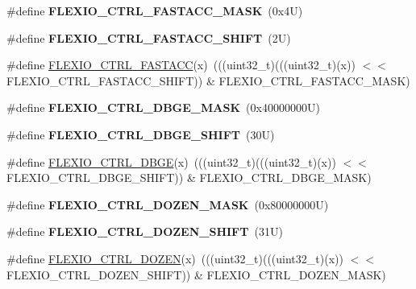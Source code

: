 \begin{DoxyCompactItemize}
\#define {\bfseries F\+L\+E\+X\+I\+O\+\_\+\+C\+T\+R\+L\+\_\+\+F\+A\+S\+T\+A\+C\+C\+\_\+\+M\+A\+SK}~(0x4\+U)
\item 
\mbox{\label{group___f_l_e_x_i_o___register___masks_ga479b6f2cd73feb716395c92639184083}} 
\#define {\bfseries F\+L\+E\+X\+I\+O\+\_\+\+C\+T\+R\+L\+\_\+\+F\+A\+S\+T\+A\+C\+C\+\_\+\+S\+H\+I\+FT}~(2\+U)
\item 
\#define \mbox{\hyperlink{group___f_l_e_x_i_o___register___masks_gada21af7886439796fc0f880c14c20519}{F\+L\+E\+X\+I\+O\+\_\+\+C\+T\+R\+L\+\_\+\+F\+A\+S\+T\+A\+CC}}(x)~(((uint32\+\_\+t)(((uint32\+\_\+t)(x)) $<$$<$ F\+L\+E\+X\+I\+O\+\_\+\+C\+T\+R\+L\+\_\+\+F\+A\+S\+T\+A\+C\+C\+\_\+\+S\+H\+I\+FT)) \& F\+L\+E\+X\+I\+O\+\_\+\+C\+T\+R\+L\+\_\+\+F\+A\+S\+T\+A\+C\+C\+\_\+\+M\+A\+SK)
\item 
\mbox{\label{group___f_l_e_x_i_o___register___masks_gae97e4a693fb34a9f89a313b84a13be6b}} 
\#define {\bfseries F\+L\+E\+X\+I\+O\+\_\+\+C\+T\+R\+L\+\_\+\+D\+B\+G\+E\+\_\+\+M\+A\+SK}~(0x40000000\+U)
\item 
\mbox{\label{group___f_l_e_x_i_o___register___masks_ga8de254d900096ed89b0a4de470fdcfd2}} 
\#define {\bfseries F\+L\+E\+X\+I\+O\+\_\+\+C\+T\+R\+L\+\_\+\+D\+B\+G\+E\+\_\+\+S\+H\+I\+FT}~(30\+U)
\item 
\#define \mbox{\hyperlink{group___f_l_e_x_i_o___register___masks_ga0b061e9fb6d238eb6b9d3b1923c6dfb5}{F\+L\+E\+X\+I\+O\+\_\+\+C\+T\+R\+L\+\_\+\+D\+B\+GE}}(x)~(((uint32\+\_\+t)(((uint32\+\_\+t)(x)) $<$$<$ F\+L\+E\+X\+I\+O\+\_\+\+C\+T\+R\+L\+\_\+\+D\+B\+G\+E\+\_\+\+S\+H\+I\+FT)) \& F\+L\+E\+X\+I\+O\+\_\+\+C\+T\+R\+L\+\_\+\+D\+B\+G\+E\+\_\+\+M\+A\+SK)
\item 
\mbox{\label{group___f_l_e_x_i_o___register___masks_ga4195023f16e9830f242b7869f14b556d}} 
\#define {\bfseries F\+L\+E\+X\+I\+O\+\_\+\+C\+T\+R\+L\+\_\+\+D\+O\+Z\+E\+N\+\_\+\+M\+A\+SK}~(0x80000000\+U)
\item 
\mbox{\label{group___f_l_e_x_i_o___register___masks_gac91461f62c8d5c8e1afa3822b4cd16f1}} 
\#define {\bfseries F\+L\+E\+X\+I\+O\+\_\+\+C\+T\+R\+L\+\_\+\+D\+O\+Z\+E\+N\+\_\+\+S\+H\+I\+FT}~(31\+U)
\item 
\#define \mbox{\hyperlink{group___f_l_e_x_i_o___register___masks_ga37478072e6ba8c6b01b9afc8ecd3e709}{F\+L\+E\+X\+I\+O\+\_\+\+C\+T\+R\+L\+\_\+\+D\+O\+Z\+EN}}(x)~(((uint32\+\_\+t)(((uint32\+\_\+t)(x)) $<$$<$ F\+L\+E\+X\+I\+O\+\_\+\+C\+T\+R\+L\+\_\+\+D\+O\+Z\+E\+N\+\_\+\+S\+H\+I\+FT)) \& F\+L\+E\+X\+I\+O\+\_\+\+C\+T\+R\+L\+\_\+\+D\+O\+Z\+E\+N\+\_\+\+M\+A\+SK)
\end{DoxyCompactItemize}
